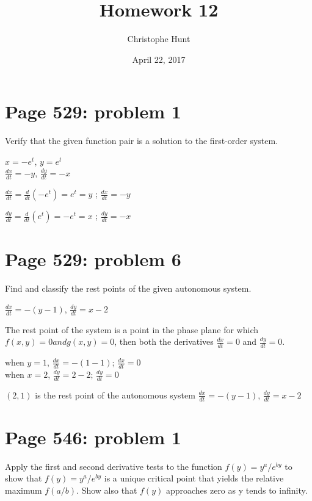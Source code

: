 \documentclass[]{article}
\title{Homework 12}
\author{Christophe Hunt}
\date{April 22, 2017}
\begin{document}
\maketitle

{
\setcounter{tocdepth}{2}
\tableofcontents
}
\newpage

\section{Page 529: problem 1}\label{page-529-problem-1}

Verify that the given function pair is a solution to the first-order
system.

\(x = -e^t\), \(y = e^t\)\\
\(\frac{dx}{dt} = -y\), \(\frac{dy}{dt} = -x\)

\(\frac{dx}{dt} = \frac{d}{dt}(-e^t) = e^t = y\) ;
\(\frac{dx}{dt} = -y\)

\(\frac{dy}{dt} = \frac{d}{dt}(e^t) = -e^t = x\) ;
\(\frac{dy}{dt} = -x\)

\section{Page 529: problem 6}\label{page-529-problem-6}

Find and classify the rest points of the given autonomous system.

\(\frac{dx}{dt} = -(y-1)\), \(\frac{dy}{dt} = x-2\)

The rest point of the system is a point in the phase plane for which
\(f(x,y) = 0 and g(x,y) = 0\), then both the derivatives
\(\frac{dx}{dt} = 0\) and \(\frac{dy}{dt}= 0\).

when \(y = 1\), \(\frac{dx}{dt} = -(1-1)\); \(\frac{dx}{dt}= 0\)\\
when \(x = 2\), \(\frac{dy}{dt} = 2 - 2\); \(\frac{dy}{dt} = 0\)

\((2,1)\) is the rest point of the autonomous system
\(\frac{dx}{dt} = -(y-1)\), \(\frac{dy}{dt} = x-2\)

\section{Page 546: problem 1}\label{page-546-problem-1}

Apply the first and second derivative tests to the function
\(f(y) = y^a/e^{by}\) to show that \(f(y) = y^a/e^{by}\) is a unique
critical point that yields the relative maximum \(f(a/b)\). Show also
that \(f(y)\) approaches zero as y tends to infinity.
\end{document}

